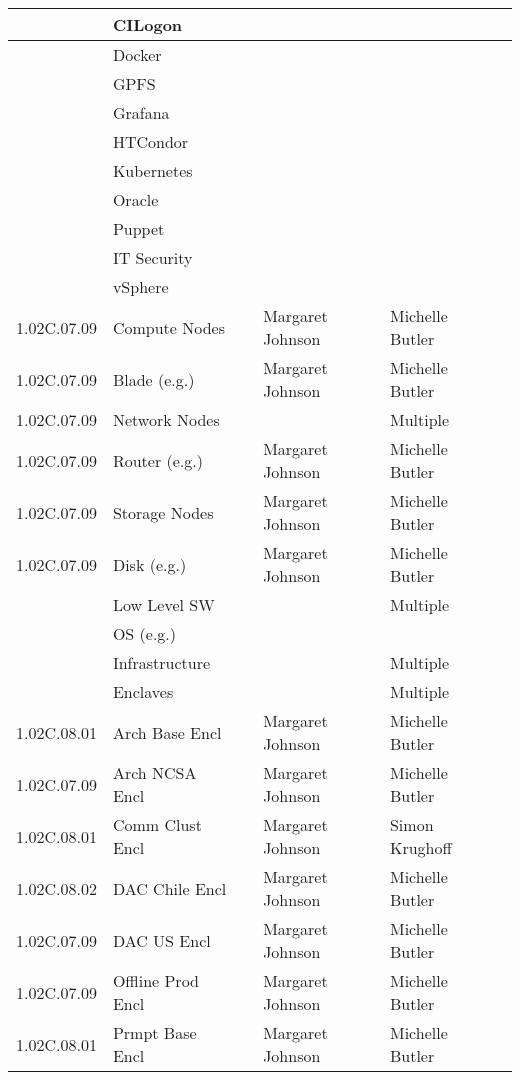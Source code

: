 \begin{longtable}{|p{}|p{}|p{}|p{}|p{}|p{}|}
 &  CILogon &  &  &  & \\ \hline
 &  Docker &  &  &  & \\ \hline
 &  GPFS &  &  &  & \\ \hline
 &  Grafana &  &  &  & \\ \hline
 &  HTCondor &  &  &  & \\ \hline
 &  Kubernetes &  &  &  & \\ \hline
 &  Oracle &  &  &  & \\ \hline
 &  Puppet &  &  &  & \\ \hline
 &  IT Security &  &  &  & \\ \hline
 &  vSphere &  &  &  & \\ \hline
1.02C.07.09 &  Compute Nodes &  & Margaret Johnson & Michelle Butler & \\ \hline
1.02C.07.09 &  Blade (e.g.) &  & Margaret Johnson & Michelle Butler & \\ \hline
1.02C.07.09 &  Network Nodes &  &  & Multiple & \\ \hline
1.02C.07.09 &  Router (e.g.) &  & Margaret Johnson & Michelle Butler & \\ \hline
1.02C.07.09 &  Storage Nodes &  & Margaret Johnson & Michelle Butler & \\ \hline
1.02C.07.09 &  Disk (e.g.) &  & Margaret Johnson & Michelle Butler & \\ \hline
 &  Low Level SW &  &  & Multiple & \\ \hline
 &  OS (e.g.) &  &  &  & \\ \hline
 &  Infrastructure &  &  & Multiple & \\ \hline
 &  Enclaves &  &  & Multiple & \\ \hline
1.02C.08.01 &  Arch Base Encl &  & Margaret Johnson & Michelle Butler & \\ \hline
1.02C.07.09 &  Arch NCSA Encl &  & Margaret Johnson & Michelle Butler & \\ \hline
1.02C.08.01 &  Comm Clust Encl &  & Margaret Johnson & Simon Krughoff & \\ \hline
1.02C.08.02 &  DAC Chile Encl &  & Margaret Johnson & Michelle Butler & \\ \hline
1.02C.07.09 &  DAC US Encl &  & Margaret Johnson & Michelle Butler & \\ \hline
1.02C.07.09 &  Offline Prod Encl &  & Margaret Johnson & Michelle Butler & \\ \hline
1.02C.08.01 &  Prmpt Base Encl &  & Margaret Johnson & Michelle Butler & \\ \hline

\end{longtable}
